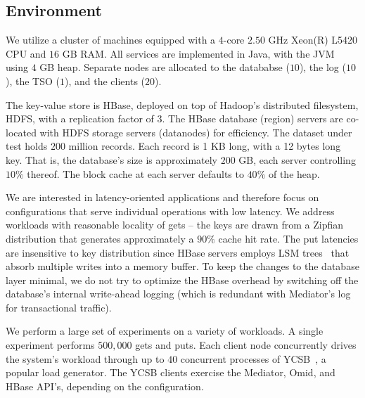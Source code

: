 \subsection{Environment}
\label{sec:testing platform}

We utilize a cluster of machines equipped with a $4$-core $2.50$ GHz Xeon(R) L5420 
CPU and $16$ GB RAM. All services are implemented in Java, with the JVM using $4$ GB heap.  
Separate nodes are allocated to the datababse ($10$), the log ($10$),  the TSO ($1$), and the clients ($20$). 

The key-value store is HBase, deployed on top of Hadoop's distributed filesystem, HDFS, with a replication 
factor of $3$. The HBase database (region) servers are co-located with HDFS storage servers (datanodes) for 
efficiency. The dataset under test holds $200$ million records. Each record
is 1 KB long, with a 12 bytes long key. That is, the database's size is
approximately $200$ GB, each server controlling $10\%$ thereof.  The block cache at each server defaults to $40\%$
of the heap.

We are interested in latency-oriented applications and therefore focus on
configurations that serve individual operations with low latency.
We address workloads with reasonable locality of gets -- the keys are drawn from
a Zipfian distribution that generates approximately a $90\%$ cache hit rate. The
put latencies are insensitive to key distribution since HBase servers employs
LSM trees~\cite{FDPlus2012} that absorb multiple writes into a memory buffer.
To keep the changes to the database layer minimal, we do not try to optimize the HBase overhead 
by switching off the database's internal write-ahead logging (which is redundant with Mediator's log 
for transactional traffic).
 
We perform a large set of experiments on a variety of workloads. A single experiment performs 
$500{,}000$ gets and puts. Each client node concurrently drives the system's workload through 
up to $40$ concurrent processes of YCSB~\cite{YCSB2010}, a popular load generator. 
The YCSB clients exercise the Mediator, Omid, and HBase API's, depending on the configuration. 

